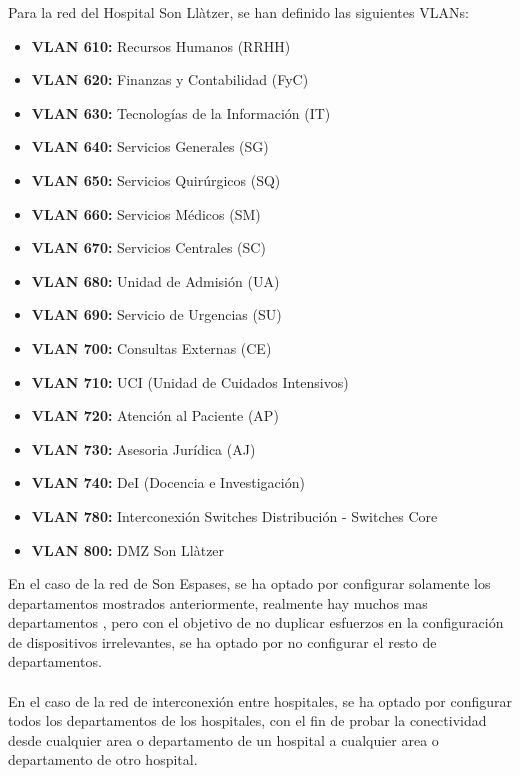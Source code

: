 Para la red del Hospital Son Llàtzer, se han definido las siguientes VLANs:
\begin{itemize}
    \item \textbf{VLAN 610:} Recursos Humanos (RRHH)
    \item \textbf{VLAN 620:} Finanzas y Contabilidad (FyC)
    \item \textbf{VLAN 630:} Tecnologías de la Información (IT)
    \item \textbf{VLAN 640:} Servicios Generales (SG)
    \item \textbf{VLAN 650:} Servicios Quirúrgicos (SQ)
    \item \textbf{VLAN 660:} Servicios Médicos (SM)
    \item \textbf{VLAN 670:} Servicios Centrales (SC)
    \item \textbf{VLAN 680:} Unidad de Admisión (UA)
    \item \textbf{VLAN 690:} Servicio de Urgencias (SU)
    \item \textbf{VLAN 700:} Consultas Externas (CE)
    \item \textbf{VLAN 710:} UCI (Unidad de Cuidados Intensivos)
    \item \textbf{VLAN 720:} Atención al Paciente (AP)
    \item \textbf{VLAN 730:} Asesoria Jurídica (AJ)
    \item \textbf{VLAN 740:} DeI (Docencia e Investigación)
    \item \textbf{VLAN 780:} Interconexión Switches Distribución - Switches Core
    \item \textbf{VLAN 800:} DMZ Son Llàtzer
\end{itemize}

En el caso de la red de Son Espases, se ha optado por configurar solamente los departamentos mostrados anteriormente, realmente hay muchos mas departamentos \cite{GerenciaSonEspases}, pero con el objetivo
de no duplicar esfuerzos en la configuración de dispositivos irrelevantes, se ha optado por no configurar el resto de departamentos.
\\ \\
En el caso de la red de interconexión entre hospitales, se ha optado por configurar todos los departamentos de los hospitales, con el fin de probar la conectividad desde cualquier area o 
departamento de un hospital a cualquier area o departamento de otro hospital.


